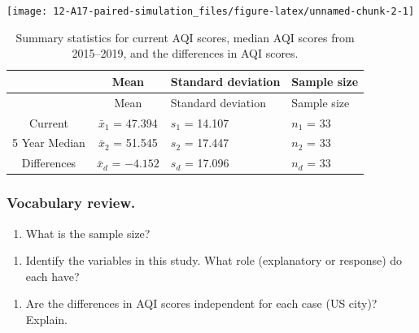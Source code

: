 \documentclass[
]{report}
\providecommand{\tightlist}{%
  \setlength{\itemsep}{0pt}\setlength{\parskip}{0pt}}
\begin{document}
\vspace{.05in}

\begin{center}\texttt{[image: 12-A17-paired-simulation\_files/figure-latex/unnamed-chunk-2-1]} \end{center}

\vspace{.2in}

\begin{longtable}[]{@{}ccll@{}}
\caption{Summary statistics for current AQI scores, median AQI scores from 2015--2019, and the differences in AQI scores.}\tabularnewline
\toprule
& Mean & Standard deviation & Sample size \\
\midrule
\endfirsthead
\toprule
& Mean & Standard deviation & Sample size \\
\midrule
\endhead
Current & \(\bar{x}_1\) = 47.394 & \(s_1\) = 14.107 & \(n_1\) = 33 \\
5 Year Median & \(\bar{x}_2\) = 51.545 & \(s_2\) = 17.447 & \(n_2\) = 33 \\
Differences & \(\bar{x}_d\) = \(-4.152\) & \(s_d\) = 17.096 & \(n_d\) = 33 \\
\bottomrule
\end{longtable}

\newpage

\hypertarget{vocabulary-review.-4}{%
\subsubsection*{Vocabulary review.}\label{vocabulary-review.-4}}

\begin{enumerate}
\def\labelenumi{\arabic{enumi}.}
\tightlist
\item
  What is the sample size?
\end{enumerate}

\vspace{0.3in}

\begin{enumerate}
\def\labelenumi{\arabic{enumi}.}
\setcounter{enumi}{1}
\tightlist
\item
  Identify the variables in this study. What role (explanatory or response) do each have?
\end{enumerate}

\vspace{.5in}

\begin{enumerate}
\def\labelenumi{\arabic{enumi}.}
\setcounter{enumi}{2}
\tightlist
\item
  Are the differences in AQI scores independent for each case (US city)? Explain.
\end{enumerate}
\end{document}
